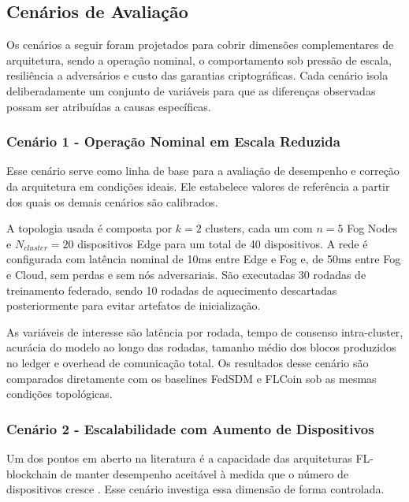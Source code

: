 \documentclass[12pt]{article}
\begin{document}
\subsection{Cenários de Avaliação}
\label{sec:cenarios}

Os cenários a seguir foram projetados para cobrir dimensões complementares de arquitetura, sendo a operação nominal, o comportamento sob pressão de escala, resiliência a adversários e custo das garantias criptográficas. Cada cenário isola deliberadamente um conjunto de variáveis para que as diferenças observadas possam ser atribuídas a causas específicas.

\subsubsection{Cenário 1 - Operação Nominal em Escala Reduzida}

Esse cenário serve como linha de base para a avaliação de desempenho e correção da arquitetura em condições ideais. Ele estabelece valores de referência a partir dos quais os demais cenários são calibrados.

A topologia usada é composta por $k=2$ clusters, cada um com $n=5$ Fog Nodes e $N_{cluster}=20$ dispositivos Edge para um total de 40 dispositivos. A rede é configurada com latência nominal de 10ms entre Edge e Fog e, de 50ms entre Fog e Cloud, sem perdas e sem nós adversariais. São executadas 30 rodadas de treinamento federado, sendo 10 rodadas de aquecimento descartadas posteriormente para evitar artefatos de inicialização.

As variáveis de interesse são latência por rodada, tempo de consenso intra-cluster, acurácia do modelo ao longo das rodadas, tamanho médio dos blocos produzidos no ledger e overhead de comunicação total. Os resultados desse cenário são comparados diretamente com os baselines FedSDM \cite{rajagopal2025} e FLCoin \cite{ren2024} sob as mesmas condições topológicas.

\subsubsection{Cenário 2 - Escalabilidade com Aumento de Dispositivos}
\label{cen:escala}

Um dos pontos em aberto na literatura é a capacidade das arquiteturas FL-blockchain de manter desempenho aceitável à medida que o número de dispositivos cresce \cite{baucas2023, murthy2026}. Esse cenário investiga essa dimensão de forma controlada.
\end{document}
